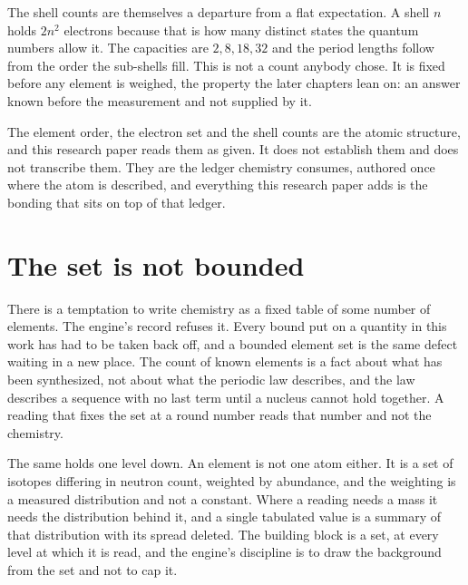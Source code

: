 The shell counts are themselves a departure from a flat expectation. A shell \(n\) holds \(2n^2\)
electrons because that is how many distinct states the quantum numbers allow it. The capacities
are \(2, 8, 18, 32\) and the period lengths follow from the order the sub-shells fill. This is not a
count anybody chose. It is fixed before any element is weighed, the property the later
chapters lean on: an answer known before the measurement and not supplied by it.

The element order, the electron set and the shell counts are the atomic structure, and this research paper
reads them as given. It does not establish them and does not transcribe them. They are the ledger
chemistry consumes, authored once where the atom is described, and everything this research paper adds is the
bonding that sits on top of that ledger.

\section{The set is not bounded}

There is a temptation to write chemistry as a fixed table of some number of elements. The engine's
record refuses it. Every bound put on a quantity in this work has had to be taken back off, and a
bounded element set is the same defect waiting in a new place. The count of known elements is a fact
about what has been synthesized, not about what the periodic law describes, and the law describes a
sequence with no last term until a nucleus cannot hold together. A reading that fixes the set at a
round number reads that number and not the chemistry.

The same holds one level down. An element is not one atom either. It is a set of isotopes differing
in neutron count, weighted by abundance, and the weighting is a measured distribution and not a
constant. Where a reading needs a mass it needs the distribution behind it, and a single tabulated
value is a summary of that distribution with its spread deleted. The building block is a set, at
every level at which it is read, and the engine's discipline is to draw the background from the set
and not to cap it.
